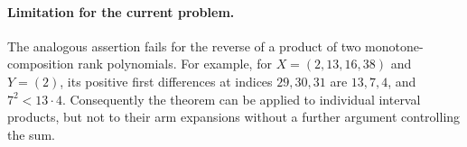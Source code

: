 \paragraph{Limitation for the current problem.}
The analogous assertion fails for the reverse of a product of
two monotone-composition rank polynomials. For example, for
$X=(2,13,16,38)$ and $Y=(2)$, its positive first differences at
indices $29,30,31$ are $13,7,4$, and $7^2<13\cdot4$.
Consequently the theorem can be applied to individual interval
products, but not to their arm expansions without a further
argument controlling the sum.
